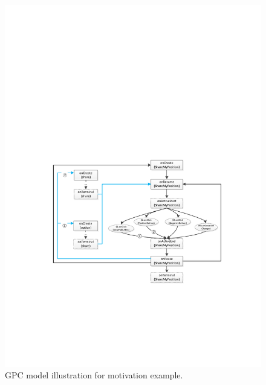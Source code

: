 \begin{figure}[!t]  
  \centering  
  \includegraphics[width=1\linewidth]{pic/motivationGPM.pdf}  
  \caption{GPC model illustration for motivation example.}  
  \label{fig:motivationGPC}  
\end{figure}

